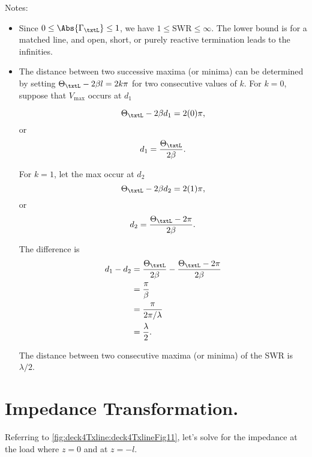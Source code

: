 Notes:
\begin{itemize}
\item Since \( 0 \le \Abs{\Gamma_\txtL} \le 1 \), we have \( 1 \le \textrm{SWR} \le \infty \).  The lower bound is for a matched line, and open, short, or purely reactive termination leads to the infinities.
\item The distance between two successive maxima (or minima) can be determined by setting \( \Theta_\txtL - 2 \beta l = 2 k \pi \) for two consecutive values of \( k \).  For \( k = 0 \), suppose that \( V_{\mathrm{max}} \) occurs at \( d_1 \)

\begin{equation}\label{eqn:uwaves4TransmissionLines:1220}
\Theta_\txtL - 2 \beta d_1 = 2 (0) \pi,
\end{equation}
or
\begin{equation}\label{eqn:uwaves4TransmissionLines:1240}
d_1 = \frac{\Theta_\txtL}{2 \beta}.
\end{equation}

For \( k = 1 \), let the max occur at \( d_2 \)
\begin{equation}\label{eqn:uwaves4TransmissionLines:1260}
\Theta_\txtL - 2 \beta d_2 = 2 (1) \pi,
\end{equation}
or
\begin{equation}\label{eqn:uwaves4TransmissionLines:1280}
d_2 = \frac{\Theta_\txtL - 2 \pi}{2 \beta}.
\end{equation}

The difference is
\begin{equation}\label{eqn:uwaves4TransmissionLines:1300}
\begin{aligned}
d_1 - d_2
&= \frac{\Theta_\txtL}{2 \beta} - \frac{\Theta_\txtL - 2 \pi}{2 \beta}
\\ &= \frac{\pi}{\beta}
\\ &= \frac{\pi}{2 \pi/\lambda}
\\ &= \frac{\lambda}{2}.
\end{aligned}
\end{equation}

The distance between two consecutive maxima (or minima) of the SWR is \( \lambda/2 \).
\end{itemize}
\section{Impedance Transformation.}
Referring to \cref{fig:deck4Txline:deck4TxlineFig11}, let's solve for the impedance at the load where \( z = 0 \) and at \( z = -l \).

